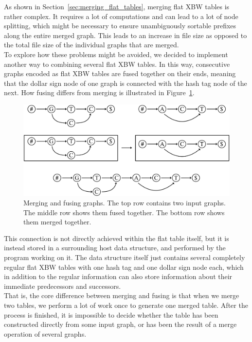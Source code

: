 \documentclass[a4paper,12pt,twoside,BCOR=10mm]{scrbook}
\begin{document}
As shown in Section~\ref{sec:merging_flat_tables}, merging flat XBW tables is rather complex.
It requires a lot of computations and can lead to a lot of node splitting,
which might be necessary to ensure unambiguously sortable prefixes along the entire merged graph.
This leads to an increase in file size as opposed to the total file
size of the individual graphs that are merged. \\
To explore how these problems might be avoided,
we decided to implement another way to combining several flat XBW tables.
In this way, consecutive graphs encoded as flat XBW tables are fused together on their ends,
meaning that the dollar sign node of one graph is connected with the hash tag node of the next.
How fusing differs from merging is illustrated in Figure~\ref{fig:evo_fig_merge_fuse_diffy}.
\begin{figure}[!htb]
\centering
\includegraphics[width=\textwidth]{evo_fig_merge_fuse_diffy.pdf}
\caption[Merging and fusing graphs]{Merging and fusing graphs. The top row contains two input graphs. The middle row shows them fused together. The bottom row shows them merged together.} \label{fig:evo_fig_merge_fuse_diffy}
\end{figure}
This connection is not directly achieved within the flat table itself,
but it is instead stored in a surrounding host data structure,
and performed by the program working on it.
The data structure itself just contains several completely regular flat XBW tables with
one hash tag and one dollar sign node each, which in addition to the regular information
can also store information about their immediate predecessors and successors. \\
That is, the core difference between merging and
fusing is that when we merge two tables, we perform a lot of work once
to generate one merged table. After the process is finished,
it is impossible to decide whether the table has been constructed directly
from some input graph, or has been the result of a merge operation of several graphs.
\end{document}
